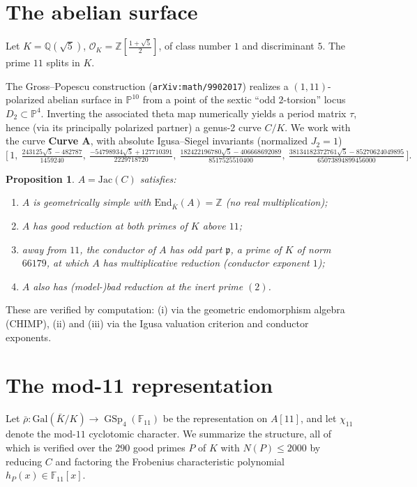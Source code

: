 \documentclass[11pt]{article}
\newtheorem{proposition}{Proposition}
\newcommand{\bbF}{\mathbb{F}}
\newcommand{\bbQ}{\mathbb{Q}}
\newcommand{\bbZ}{\mathbb{Z}}
\newcommand{\cO}{\mathcal{O}}
\newcommand{\rhob}{\bar{\rho}}
\newcommand{\Gal}{\mathrm{Gal}}
\newcommand{\Jac}{\mathrm{Jac}}
\newcommand{\End}{\mathrm{End}}
\newcommand{\chicyc}{\chi_{11}}
\DeclareMathOperator{\GSp}{GSp}
\begin{document}
\section{The abelian surface}\label{sec:surface}

Let $K=\bbQ(\sqrt5)$, $\cO_K=\bbZ[\tfrac{1+\sqrt5}2]$, of class number $1$ and discriminant
$5$. The prime $11$ splits in $K$.

The Gross--Popescu construction (\texttt{arXiv:math/9902017}) realizes a $(1,11)$-polarized
abelian surface in $\mathbb P^{10}$ from a point of the sextic ``odd $2$-torsion'' locus
$D_2\subset\mathbb P^4$. Inverting the associated theta map numerically yields a period matrix
$\tau$, hence (via its principally polarized partner) a genus-2 curve $C/K$. We work with the
curve {\bf Curve A}, with absolute Igusa--Siegel invariants (normalized $J_2=1$)
\[
\Big[\,1,\ \tfrac{243125\sqrt5-482787}{1459240},\
\tfrac{-54798934\sqrt5+127710391}{2229718720},\
\tfrac{182422196780\sqrt5-406668692089}{8517525510400},\
\tfrac{38134182372761\sqrt5-85270624049895}{65073894899456000}\,\Big].
\]

\begin{proposition}\label{prop:A}
$A=\Jac(C)$ satisfies:
\begin{enumerate}
\item[(i)] $A$ is geometrically simple with $\End_{\bar K}(A)=\bbZ$ (no real multiplication);
\item[(ii)] $A$ has good reduction at both primes of $K$ above $11$;
\item[(iii)] away from $11$, the conductor of $A$ has odd part $\mathfrak p$, a prime of $K$
of norm $66179$, at which $A$ has multiplicative reduction (conductor exponent $1$);
\item[(iv)] $A$ also has (model-)bad reduction at the inert prime $(2)$.
\end{enumerate}
\end{proposition}

These are verified by computation: (i) via the geometric endomorphism algebra (CHIMP), (ii)
and (iii) via the Igusa valuation criterion and conductor exponents.

\section{The mod-11 representation}\label{sec:rep}

Let $\rhob\colon\Gal(\bar K/K)\to\GSp_4(\bbF_{11})$ be the representation on $A[11]$, and let
$\chicyc$ denote the mod-$11$ cyclotomic character. We summarize the structure, all of which
is verified over the $290$ good primes $P$ of $K$ with $N(P)\le 2000$ by reducing $C$ and
factoring the Frobenius characteristic polynomial $h_P(x)\in\bbF_{11}[x]$.
\end{document}
